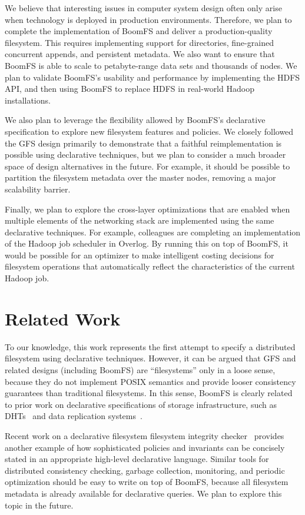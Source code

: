 \documentclass{article}
\begin{document}
We believe that interesting issues in computer system design often
only arise when technology is deployed in production
environments. Therefore, we plan to complete the implementation of
BoomFS and deliver a production-quality filesystem. This requires
implementing support for directories, fine-grained concurrent appends,
and persistent metadata. We also want to ensure that BoomFS is able to
scale to petabyte-range data sets and thousands of nodes. We plan to
validate BoomFS's usability and performance by implementing the HDFS
API, and then using BoomFS to replace HDFS in real-world Hadoop
installations.

We also plan to leverage the flexibility allowed by BoomFS's
declarative specification to explore new filesystem features and
policies. We closely followed the GFS design primarily to demonstrate
that a faithful reimplementation is possible using declarative
techniques, but we plan to consider a much broader space of design
alternatives in the future. For example, it should be possible to
partition the filesystem metadata over the master nodes, removing a
major scalability barrier.

Finally, we plan to explore the cross-layer optimizations that are
enabled when multiple elements of the networking stack are implemented
using the same declarative techniques. For example, colleagues are
completing an implementation of the Hadoop job scheduler in
Overlog. By running this on top of BoomFS, it would be possible for an
optimizer to make intelligent costing decisions for filesystem
operations that automatically reflect the characteristics of the
current Hadoop job.

\section{Related Work}
\label{related-work}
To our knowledge, this work represents the first attempt to specify a
distributed filesystem using declarative techniques. However, it can
be argued that GFS and related designs (including BoomFS) are
``filesystems'' only in a loose sense, because they do not implement
POSIX semantics and provide looser consistency guarantees than
traditional filesystems. In this sense, BoomFS is clearly related to
prior work on declarative specifications of storage infrastructure,
such as DHTs~\cite{chord-overlog} and data replication
systems~\cite{padre-draft}.

Recent work on a declarative filesystem filesystem integrity
checker~\cite{sqck} provides another example of how sophisticated
policies and invariants can be concisely stated in an appropriate
high-level declarative language. Similar tools for distributed
consistency checking, garbage collection, monitoring, and periodic
optimization should be easy to write on top of BoomFS, because all
filesystem metadata is already available for declarative queries. We
plan to explore this topic in the future.
\end{document}
